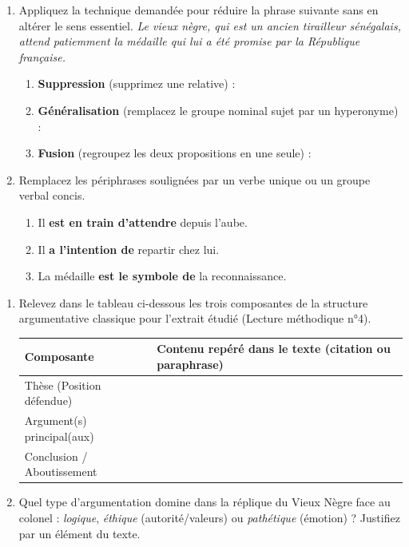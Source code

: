 \documentclass[11pt]{article}
\begin{document}
\begin{exercice}
\begin{enumerate}
    \item Appliquez la technique demandée pour réduire la phrase suivante sans en altérer le sens essentiel.
    \textit{Le vieux nègre, qui est un ancien tirailleur sénégalais, attend patiemment la médaille qui lui a été promise par la République française.}
    \begin{enumerate}
        \item \textbf{Suppression} (supprimez une relative) :
        \item \textbf{Généralisation} (remplacez le groupe nominal sujet par un hyperonyme) :
        \item \textbf{Fusion} (regroupez les deux propositions en une seule) :
    \end{enumerate}
    \item Remplacez les périphrases soulignées par un verbe unique ou un groupe verbal concis.
    \begin{enumerate}
        \item Il \textbf{est en train d'attendre} depuis l'aube.
        \item Il \textbf{a l'intention de} repartir chez lui.
        \item La médaille \textbf{est le symbole de} la reconnaissance.
    \end{enumerate}
\end{enumerate}
\end{exercice}

\begin{exercice}
\begin{enumerate}
    \item Relevez dans le tableau ci-dessous les trois composantes de la structure argumentative classique pour l'extrait étudié (Lecture méthodique n°4).
    \begin{tabular}{|l|p{10cm}|}
    \hline
    \textbf{Composante} & \textbf{Contenu repéré dans le texte (citation ou paraphrase)} \\
    \hline
    Thèse (Position défendue) & \\
    \hline
    Argument(s) principal(aux) & \\
    \hline
    Conclusion / Aboutissement & \\
    \hline
    \end{tabular}
    \item Quel type d'argumentation domine dans la réplique du Vieux Nègre face au colonel : \textit{logique}, \textit{éthique} (autorité/valeurs) ou \textit{pathétique} (émotion) ? Justifiez par un élément du texte.
\end{enumerate}
\end{exercice}
\end{document}

